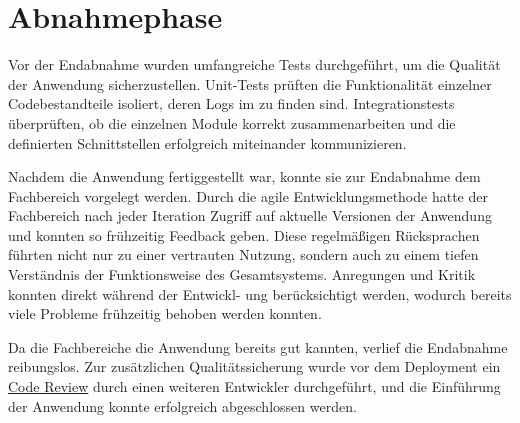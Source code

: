 \section{Abnahmephase} 
\label{sec:Abnahmephase}

Vor der Endabnahme wurden umfangreiche Tests durchgeführt, um die Qualität der Anwendung sicherzustellen. Unit-Tests prüften die Funktionalität einzelner Codebestandteile isoliert, deren Logs im  zu finden sind. Integrationstests überprüften, ob die einzelnen Module korrekt zusammenarbeiten und die definierten Schnittstellen erfolgreich miteinander kommunizieren.

Nachdem die Anwendung fertiggestellt war, konnte sie zur Endabnahme dem Fachbereich vorgelegt werden. Durch die agile Entwicklungsmethode hatte der Fachbereich nach jeder Iteration Zugriff auf aktuelle Versionen der Anwendung und konnten so frühzeitig Feedback geben. Diese regelmäßigen Rücksprachen führten nicht nur zu einer vertrauten Nutzung, sondern auch zu einem tiefen Verständnis der Funktionsweise des Gesamtsystems. Anregungen und Kritik konnten direkt während der Entwickl-
ung berücksichtigt werden, wodurch bereits viele Probleme frühzeitig behoben werden konnten.

Da die Fachbereiche die Anwendung bereits gut kannten, verlief die Endabnahme reibungslos. Zur zusätzlichen Qualitätssicherung wurde vor dem Deployment ein \hyperlink{CodeReview}{\textcolor{AOBlau}{Code Review}} durch einen weiteren Entwickler durchgeführt, und die Einführung der Anwendung konnte erfolgreich abgeschlossen werden.
